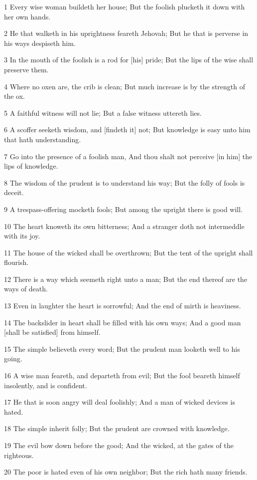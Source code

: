 \par 1 Every wise woman buildeth her house; But the foolish plucketh it down with her own hands.
\par 2 He that walketh in his uprightness feareth Jehovah; But he that is perverse in his ways despiseth him.
\par 3 In the mouth of the foolish is a rod for [his] pride; But the lips of the wise shall preserve them.
\par 4 Where no oxen are, the crib is clean; But much increase is by the strength of the ox.
\par 5 A faithful witness will not lie; But a false witness uttereth lies.
\par 6 A scoffer seeketh wisdom, and [findeth it] not; But knowledge is easy unto him that hath understanding.
\par 7 Go into the presence of a foolish man, And thou shalt not perceive [in him] the lips of knowledge.
\par 8 The wisdom of the prudent is to understand his way; But the folly of fools is deceit.
\par 9 A trespass-offering mocketh fools; But among the upright there is good will.
\par 10 The heart knoweth its own bitterness; And a stranger doth not intermeddle with its joy.
\par 11 The house of the wicked shall be overthrown; But the tent of the upright shall flourish.
\par 12 There is a way which seemeth right unto a man; But the end thereof are the ways of death.
\par 13 Even in laughter the heart is sorrowful; And the end of mirth is heaviness.
\par 14 The backslider in heart shall be filled with his own ways; And a good man [shall be satisfied] from himself.
\par 15 The simple believeth every word; But the prudent man looketh well to his going.
\par 16 A wise man feareth, and departeth from evil; But the fool beareth himself insolently, and is confident.
\par 17 He that is soon angry will deal foolishly; And a man of wicked devices is hated.
\par 18 The simple inherit folly; But the prudent are crowned with knowledge.
\par 19 The evil bow down before the good; And the wicked, at the gates of the righteous.
\par 20 The poor is hated even of his own neighbor; But the rich hath many friends.
